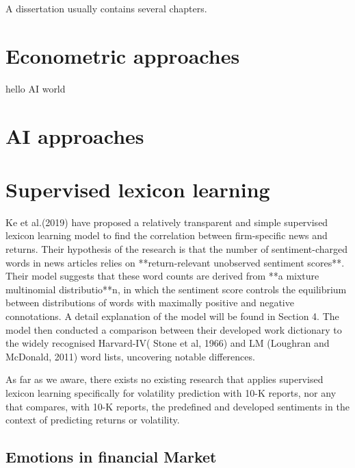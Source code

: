 \documentclass[logo,bsc,singlespacing,parskip]{infthesis}
\begin{document}
A dissertation usually contains several chapters.
\section{Econometric approaches}
hello AI world
\section{AI approaches}
\section{Supervised lexicon learning}
Ke et al.(2019) have proposed a relatively transparent and simple supervised lexicon learning model to find the correlation between firm-specific news and returns. Their hypothesis of the research is that the number of sentiment-charged words in news articles relies on **return-relevant unobserved sentiment scores**. Their model suggests that these word counts are derived from **a mixture multinomial distributio**n, in which the sentiment score controls the equilibrium between distributions of words with maximally positive and negative connotations. A detail explanation of the model will be found in Section 4. The model then conducted a comparison between their developed work dictionary to the widely recognised Harvard-IV( Stone et al, 1966) and LM (Loughran and McDonald, 2011) word lists, uncovering notable differences. 

As far as we aware, there exists no existing research that applies supervised lexicon learning specifically for volatility prediction with 10-K reports, nor any that compares, with 10-K reports, the predefined and developed sentiments in the context of predicting returns or volatility.

\subsection{Emotions in financial Market}
\end{document}
